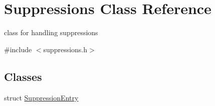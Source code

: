 \hypertarget{class_suppressions}{\section{Suppressions Class Reference}
\label{class_suppressions}
}


class for handling suppressions  




{\ttfamily \#include $<$suppressions.\-h$>$}

\subsection*{Classes}
\begin{DoxyCompactItemize}
\item 
struct \hyperlink{struct_suppressions_1_1_suppression_entry}{Suppression\-Entry}
\end{DoxyCompactItemize}
